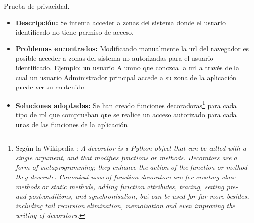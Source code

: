 \item Prueba de privacidad.
  \begin{itemize}
    \item \textbf{Descripción:} Se intenta acceder a zonas del sistema donde el
    usuario identificado no tiene permiso de acceso.
    \item \textbf{Problemas encontrados:} Modificando manualmente la url del
    navegador es posible acceder a zonas del sistema no autorizadas para el
    usuario identificado. Ejemplo: un usuario Alumno que conozca la url a través
    de la cual un usuario Administrador principal accede a su zona de la
    aplicación puede ver su contenido.
    \item \textbf{Soluciones adoptadas:} Se han creado funciones
    decoradoras\footnote{Según la Wikipedia \cite{wikipedia1} : \textit{A
    decorator is a Python object that can be called with a single argument, and
    that modifies functions or methods. Decorators are a form of
    metaprogramming; they enhance the action of the function or method they
    decorate. Canonical uses of function decorators are for creating class
    methods or static methods, adding function attributes, tracing, setting pre-
    and postconditions, and synchronisation, but can be used for far more
    besides, including tail recursion elimination, memoization and even
    improving the writing of decorators.}}
    para cada tipo de rol que comprueban que se realice un acceso autorizado
    para cada unas de las funciones de la aplicación.
  \end{itemize}
